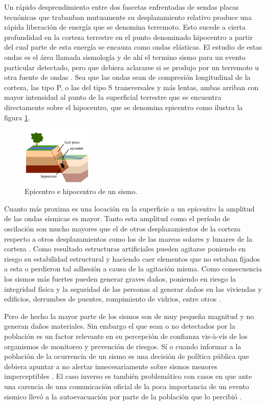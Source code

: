 \documentclass[a4paper]{report}
\begin{document}
Un rápido desprendimiento entre dos fascetas enfrentadas de sendas placas tecnónicas que trabanban mutuamente su desplazamiento relativo produce una rápida liberación de energía que se denomina terremoto.
Esto sucede a cierta profundidad en la corteza terrestre en el punto denominado hipocentro a partir del cual parte de esta energía se encauza como ondas elásticas.
El estudio de estas ondas es el área llamada sismología y de ahí el termino sismo para un evento particular detectado, pero que debiera aclararse si se produjo por un terremoto u otra fuente de ondas \cite[sección 4.1.1]{fowler_solid_2004}.
Sea que las ondas sean de compresión longitudinal de la corteza, las tipo P, o las del tipo S transversales y más lentas, ambas arriban con mayor intensidad al punto de la superficial terrestre que se encuentra directamente sobre el hipocentro, que se denomina epicentro \cite[sección 4.1.2]{fowler_solid_2004} como ilustra la figura \ref{fig:epicentro_hipocentro}.
\begin{figure}
  \centering
	\includegraphics[width=0.3\textwidth]{eq-ed-fault-labeled.png}
	\caption{Epicentro e hipocentro de un sismo.}
	\label{fig:epicentro_hipocentro}
\end{figure}
Cuanto más proxima es una locación en la superficie a un epicentro la amplitud de las ondas sísmicas es mayor.
Tanto esta amplitud como el período de oscilación son mucho mayores que el de otros desplazamientos de la corteza respecto a otros desplazamientos como los de las mareas solares y lunares de la corteza \cite[sección 4.1.4]{fowler_solid_2004}.
Como resultado estructuras artificiales pueden agitarse poniendo en riesgo su estabilidad estructural y haciendo caer elementos que no estaban fijados a esta o perdieron tal adhesión a causa de la agitación misma.
Como consecuencia los sismos más fuertes pueden generar graves daños, poniendo en riesgo la integridad física y la seguridad de las personas al generar daños en las viviendas y edificios, derrumbes de puentes, rompimiento de vidrios, entre otros \cite{noauthor_que_2018}.

Pero de hecho la mayor parte de los sismos son de muy pequeña magnitud y no generan daños materiales.
Sin embargo el que sean o no detectados por la población es un factor relevante en su percepción de confianza vis-à-vís de los organismos de monitoreo y prevención de riesgos.
Sí o cuando informar a la población de la ocurrencia de un sismo es una decisión de política pública que debiera apuntar a no alertar  innecesariamente sobre sismos menores imperceptibles \cite{saunders_j_k_twist_nodate}.
El caso inverso es también problemático con casos en que ante una carencia de una comunicación oficial de la poca importancia de un evento sismico llevó a la autoevacuación por parte de la población que lo percibió \cite{vaiciulyte_population_2022}. 
\end{document}
